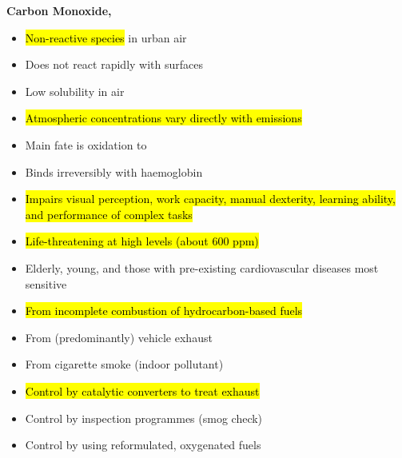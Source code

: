 \documentclass{article}
\newcommand{\headingsmall}[1]{{\small\textbf{#1}}}
\begin{document}
\begin{multicols*}{4}
\headingsmall{Carbon Monoxide, }
\begin{itemize} \itemsep -0.5em
    \item \hl{Non-reactive species} in urban air
    \item Does not react rapidly with surfaces
    \item Low solubility in air
    \item \hl{Atmospheric concentrations vary directly with emissions}
    \item Main fate is oxidation to 
    \item Binds irreversibly with haemoglobin
    \item \hl{Impairs visual perception, work capacity, manual dexterity, 
        learning ability, and performance of complex tasks}
    \item \hl{Life-threatening at high levels (about 600 ppm)}
    \item Elderly, young, and those with pre-existing cardiovascular diseases most
        sensitive
    \item \hl{From incomplete combustion of hydrocarbon-based fuels}
    \item From (predominantly) vehicle exhaust
    \item From cigarette smoke (indoor pollutant)
    \item \hl{Control by catalytic converters to treat exhaust}
    \item Control by inspection programmes (smog check)
    \item Control by using reformulated, oxygenated fuels
\end{itemize}


\end{multicols*}
\end{document}
